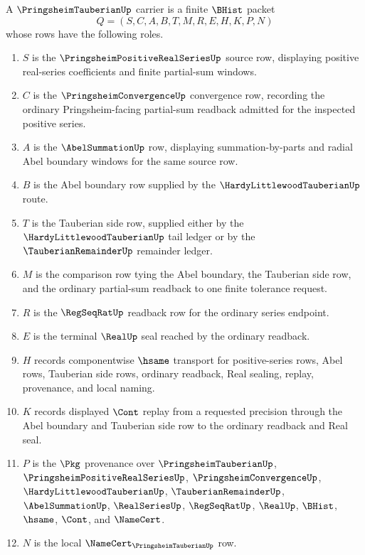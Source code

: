 \begin{definition}
\label{def:pringsheim-tauberian-carrier}
A $\PringsheimTauberianUp$ carrier is a finite $\BHist$ packet
$$
Q=(S,C,A,B,T,M,R,E,H,K,P,N)
$$
whose rows have the following roles.
\begin{enumerate}
\item $S$ is the $\PringsheimPositiveRealSeriesUp$ source row, displaying positive real-series coefficients and finite partial-sum windows.
\item $C$ is the $\PringsheimConvergenceUp$ convergence row, recording the ordinary Pringsheim-facing partial-sum readback admitted for the inspected positive series.
\item $A$ is the $\AbelSummationUp$ row, displaying summation-by-parts and radial Abel boundary windows for the same source row.
\item $B$ is the Abel boundary row supplied by the $\HardyLittlewoodTauberianUp$ route.
\item $T$ is the Tauberian side row, supplied either by the $\HardyLittlewoodTauberianUp$ tail ledger or by the $\TauberianRemainderUp$ remainder ledger.
\item $M$ is the comparison row tying the Abel boundary, the Tauberian side row, and the ordinary partial-sum readback to one finite tolerance request.
\item $R$ is the $\RegSeqRatUp$ readback row for the ordinary series endpoint.
\item $E$ is the terminal $\RealUp$ seal reached by the ordinary readback.
\item $H$ records componentwise $\hsame$ transport for positive-series rows, Abel rows, Tauberian side rows, ordinary readback, Real sealing, replay, provenance, and local naming.
\item $K$ records displayed $\Cont$ replay from a requested precision through the Abel boundary and Tauberian side row to the ordinary readback and Real seal.
\item $P$ is the $\Pkg$ provenance over $\PringsheimTauberianUp$, $\PringsheimPositiveRealSeriesUp$, $\PringsheimConvergenceUp$, $\HardyLittlewoodTauberianUp$, $\TauberianRemainderUp$, $\AbelSummationUp$, $\RealSeriesUp$, $\RegSeqRatUp$, $\RealUp$, $\BHist$, $\hsame$, $\Cont$, and $\NameCert$.
\item $N$ is the local $\NameCert_{\PringsheimTauberianUp}$ row.
\end{enumerate}
\end{definition}

